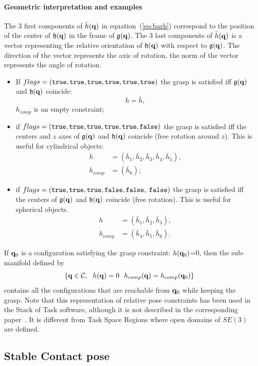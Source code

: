 \paragraph{Geometric interpretation and examples}
The 3 first components of $\bar{h}(\mathbf{q})$ in equation~(\ref{eq:barh}) correspond to the position of the center of $\mathfrak{h}(\mathbf{q})$ in the frame of $\mathfrak{g}(\mathbf{q})$. The 3 last components of $\bar{h}(\mathbf{q})$ is a vector representing the relative orientation of $\mathfrak{h}(\mathbf{q})$ with respect to $\mathfrak{g}(\mathbf{q})$. The direction of the vector represents the axis of rotation, the norm of the vector represents the angle of rotation.
\begin{itemize}
\item If $flags=(\texttt{true},\texttt{true},\texttt{true},\texttt{true},\texttt{true},\texttt{true})$ the grasp is satisfied iff $\mathfrak{g}(\mathbf{q})$ and $\mathfrak{h}(\mathbf{q})$ coincide:
  $$ h =\bar{h},$$
  $h_{comp}$ is an empty constraint;
\item if $flags=(\texttt{true},\texttt{true},\texttt{true},\texttt{true},\texttt{true},\texttt{false})$ the grasp is satisfied iff the centers and $z$ axes of $\mathfrak{g}(\mathbf{q})$ and $\mathfrak{h}(\mathbf{q})$ coincide (free rotation around $z$). This is useful for cylindrical objects:
  \begin{align*}
    h &= (\bar{h}_1,\bar{h}_2,\bar{h}_3,\bar{h}_4,\bar{h}_5),\\
    h_{comp} &= (\bar{h}_6);
  \end{align*}
\item if $flags=(\texttt{true},\texttt{true},\texttt{true},\texttt{false},\texttt{false},$ $\texttt{false})$ the grasp is satisfied iff the centers of $\mathfrak{g}(\mathbf{q})$ and $\mathfrak{h}(\mathbf{q})$ coincide (free rotation). This is useful for spherical objects.
  \begin{align*}
    h &= (\bar{h}_1,\bar{h}_2,\bar{h}_3),\\
    h_{comp} &= (\bar{h}_4,\bar{h}_5,\bar{h}_6).
  \end{align*}
\end{itemize}
If $\mathbf{q}_0$ is a configuration satisfying the grasp constraint: $h(\mathbf{q}_0)$=0, then the sub-manifold defined by
$$
\left\{\conf\in\CS,\ \ h(\conf)=0\ \ h_{comp}(\conf) =  h_{comp}(\conf_0)\right\}
$$
contains all the configurations that are reachable from $\mathbf{q}_0$ while keeping the grasp. Note that this representation of relative pose constraints has been used in the Stack of Task software, although it is not described in the corresponding paper~\cite{SoT}. It is different from Task Space Regions \cite{berenson2011} where open domains of $SE(3)$ are defined.

\subsection{Stable Contact pose}\label{subsec:placement}

